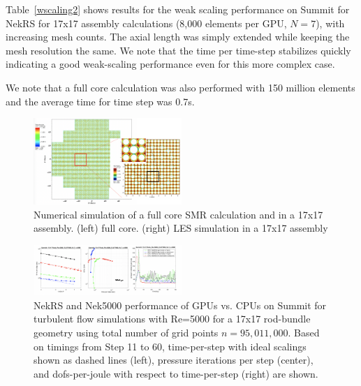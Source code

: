 \documentclass{anstrans}
\begin{document}
Table~\ref{wscaling2} shows results for the weak scaling performance on Summit for NekRS for 17x17 assembly calculations (8,000 elements per GPU, $N=7$), with increasing mesh counts. The axial length was simply extended while keeping the mesh resolution the same. We note that the time per time-step stabilizes quickly indicating a good weak-scaling performance even for this more complex  case.

We note that a full core calculation was also performed with 150 million elements and the average time for time step was 0.7s.

\begin{figure}[!ht]
\centering
\includegraphics[width=0.5\textwidth]{./Figures/full_core_summary.png}
\caption{Numerical simulation of a full core SMR calculation and in a 17x17 assembly. (left) full core. (right) LES simulation in a 17x17 assembly}
\label{fig:gpu2}
\end{figure}

\begin{figure}[h]
\centering
\includegraphics[width=0.5\textwidth]{./Figures/performance_nekrs}
\caption{ NekRS and Nek5000 performance of GPUs vs. CPUs on Summit for turbulent flow simulations with Re=5000 for a 17x17 rod-bundle geometry using total number of grid points $n=95,011,000$. Based on timings from Step 11 to 60, time-per-step with ideal scalings shown as dashed lines (left), pressure iterations per step (center), and dofs-per-joule with respect to time-per-step (right) are shown.}
\label{fig:nekrs1}
\end{figure}


\begin{table} [!b]
\caption{\label{wscaling2}  Weak-scaling on Summit for 17x17 assembly case.}
\end{table}
\end{document}
